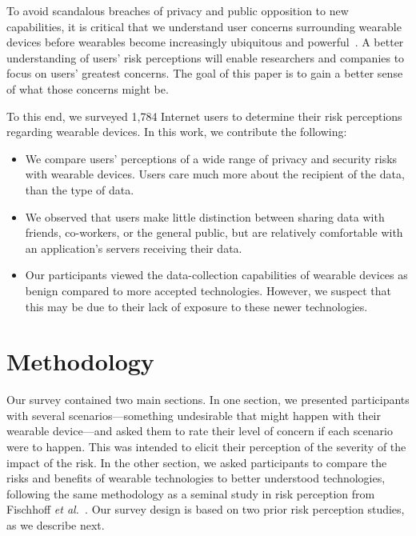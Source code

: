 \documentclass{acm_proc_article-sp}
\def\etal{{\it et al.~}}
\begin{document}
To avoid scandalous breaches of privacy and public opposition to new capabilities, it is critical that we understand user concerns surrounding wearable devices before wearables become increasingly ubiquitous and powerful~\cite{Implants}. A better understanding of users' risk perceptions will enable researchers and companies to focus on users' greatest concerns. The goal of this paper is to gain a better sense of what those concerns might be. 

To this end, we surveyed 1,784 Internet users to determine their risk perceptions regarding wearable devices. In this work, we contribute the following: \\[-0.8cm]

\begin{itemize} \itemsep1pt \parskip0pt 
\item We compare users' perceptions of a wide range of privacy and security risks with wearable devices. Users care much more about the recipient of the data, than the type of data.
\item We observed that users make little distinction between sharing data with friends, co-workers, or the general public, but are relatively comfortable with an application's servers receiving their data.
\item Our participants viewed the data-collection capabilities of wearable devices as benign compared to more accepted technologies. However, we suspect that this may be due to their lack of exposure to these newer technologies.
\end{itemize}


\section{Methodology}

Our survey contained two main sections.
In one section, we presented participants with several scenarios---something undesirable that might happen with their wearable device---and asked them to rate their level of concern if each scenario were to happen.
This was intended to elicit their perception of the severity of the impact of the risk.
In the other section, we asked participants to compare the risks and benefits of wearable technologies to better understood technologies, following the same methodology as a seminal study in risk perception from Fischhoff \etal \cite{Fischhoff}.
Our survey design is based on two prior risk perception studies, as we describe next.
\end{document}
